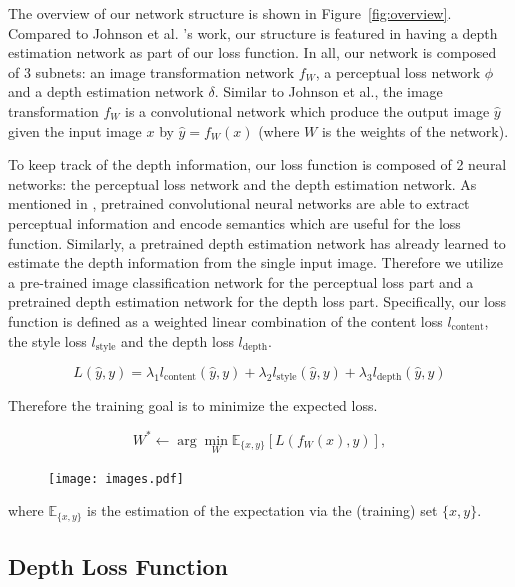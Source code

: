 \documentclass[10pt,twocolumn,letterpaper]{article}
\begin{document}
The overview of our network structure is shown in Figure~\ref{fig:overview}. Compared to Johnson et al. \cite{johnson2016perceptual}'s work, our structure is featured in having a depth estimation network as part of our loss function. In all, our network is composed of 3 subnets: an image transformation network $f_W$, a perceptual loss network $\phi$ and a depth estimation network $\delta$. Similar to Johnson et al., the image transformation $f_W$ is a convolutional network which produce the output image $\hat y$ given the input image $x$ by $\hat y = f_W(x)$ (where $W$ is the weights of the network).

To keep track of the depth information, our loss function is composed of 2 neural networks: the perceptual loss network and the depth estimation network. As mentioned in \cite{johnson2016perceptual}, pretrained convolutional neural networks are able to extract perceptual information and encode semantics which are useful for the loss function. Similarly, a pretrained depth estimation network has already learned to estimate the depth information from the single input image. Therefore we utilize a pre-trained image classification network for the perceptual loss part and a pretrained depth estimation network for the depth loss part. Specifically, our loss function is defined as a weighted linear combination of the content loss $l_\text{content}$, the style loss $l_\text{style}$ and the depth loss $l_\text{depth}$. 

\[L(\hat y, y) = \lambda_1 l_\text{content}(\hat y, y) + \lambda_2 l_\text{style}(\hat y, y) + \lambda_3 l_\text{depth}(\hat y, y)\]

Therefore the training goal is to minimize the expected loss.

\[ W^* \gets \arg \min_W \mathbb E_{\{x,y\}}[L(f_W(x), y)], \]

\begin{figure}
\vspace*{-1in}
\hspace*{-0.7in}
\texttt{[image: images.pdf]}
\end{figure}

where $\mathbb E_{\{x,y\}}$ is the estimation of the expectation via the (training) set $\{x,y\}$.

\subsection{Depth Loss Function}
\end{document}
